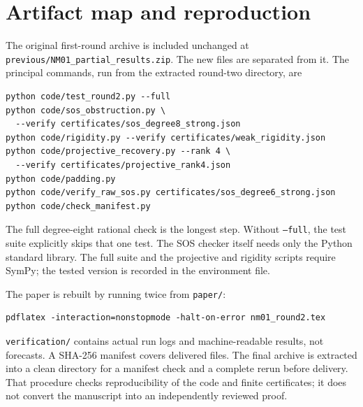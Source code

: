 \documentclass[11pt]{article}
\theoremstyle{definition}\newtheorem{definition}[theorem]{Definition}
\begin{document}
\section{Artifact map and reproduction}
The original first-round archive is included unchanged at \texttt{previous/NM01\_partial\_results.zip}. The new files are separated from it. The principal commands, run from the extracted round-two directory, are
\begin{lstlisting}
python code/test_round2.py --full
python code/sos_obstruction.py \
  --verify certificates/sos_degree8_strong.json
python code/rigidity.py --verify certificates/weak_rigidity.json
python code/projective_recovery.py --rank 4 \
  --verify certificates/projective_rank4.json
python code/padding.py
python code/verify_raw_sos.py certificates/sos_degree6_strong.json
python code/check_manifest.py
\end{lstlisting}
The full degree-eight rational check is the longest step. Without \texttt{--full}, the test suite explicitly skips that one test. The SOS checker itself needs only the Python standard library. The full suite and the projective and rigidity scripts require SymPy; the tested version is recorded in the environment file.

The paper is rebuilt by running twice from \texttt{paper/}:
\begin{lstlisting}
pdflatex -interaction=nonstopmode -halt-on-error nm01_round2.tex
\end{lstlisting}
\texttt{verification/} contains actual run logs and machine-readable results, not forecasts. A SHA-256 manifest covers delivered files. The final archive is extracted into a clean directory for a manifest check and a complete rerun before delivery. That procedure checks reproducibility of the code and finite certificates; it does not convert the manuscript into an independently reviewed proof.
\end{document}
